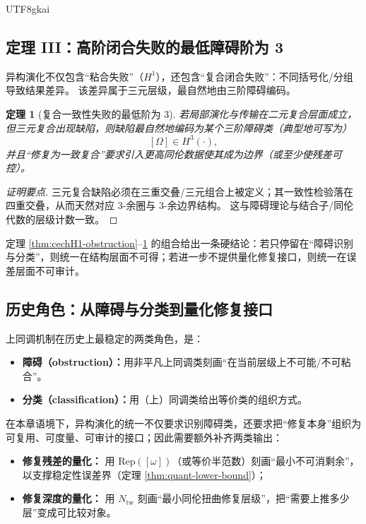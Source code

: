 \documentclass[12pt]{article}
\newtheorem{theorem}{定理}[section]
\begin{document}
\begin{CJK*}{UTF8}{gkai}
\subsection{定理 III：高阶闭合失败的最低障碍阶为 3}

异构演化不仅包含“粘合失败”（$H^1$），还包含“复合闭合失败”：不同括号化/分组导致结果差异。
该差异属于三元层级，最自然地由三阶障碍编码。

\begin{theorem}[复合一致性失败的最低阶为 3]\label{thm:H3-minimal}
若局部演化与传输在二元复合层面成立，但三元复合出现缺陷，则缺陷最自然地编码为某个三阶障碍类（典型地可写为）
\[
  [\Omega]\in H^3(\cdot),
\]
并且“修复为一致复合”要求引入更高同伦数据使其成为边界（或至少使残差可控）。
\end{theorem}

\begin{proof}[证明要点]
三元复合缺陷必须在三重交叠/三元组合上被定义；其一致性检验落在四重交叠，从而天然对应 $3$-余圈与 $3$-余边界结构。
这与障碍理论与结合子/同伦代数的层级计数一致。
\end{proof}

定理 \ref{thm:cechH1-obstruction}--\ref{thm:H3-minimal} 的组合给出一条硬结论：若只停留在“障碍识别与分类”，则统一在结构层面不可得；若进一步不提供量化修复接口，则统一在误差层面不可审计。

\subsection{历史角色：从障碍与分类到量化修复接口}

上同调机制在历史上最稳定的两类角色，是：
\begin{itemize}
  \item \textbf{障碍（obstruction）：}用非平凡上同调类刻画“在当前层级上不可能/不可粘合”。
  \item \textbf{分类（classification）：}用（上）同调类给出等价类的组织方式。
\end{itemize}

在本章语境下，异构演化的统一不仅要求识别障碍类，还要求把“修复本身”组织为可复用、可度量、可审计的接口；因此需要额外补齐两类输出：
\begin{itemize}
  \item \textbf{修复残差的量化：} 用 $\mathrm{Rep}([\omega])$（或等价半范数）刻画“最小不可消剩余”，以支撑稳定性误差界（定理 \ref{thm:quant-lower-bound}）；
  \item \textbf{修复深度的量化：} 用 $N_{\mathrm{tw}}$ 刻画“最小同伦扭曲修复层级”，把“需要上推多少层”变成可比较对象。
\end{itemize}


\end{CJK*}
\end{document}
